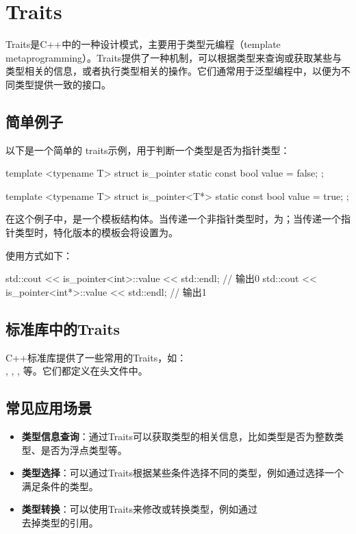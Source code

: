 \chapter{Traits}
Traits是C++中的一种设计模式，主要用于类型元编程（template metaprogramming）。Traits提供了一种机制，可以根据类型来查询或获取某些与类型相关的信息，或者执行类型相关的操作。它们通常用于泛型编程中，以便为不同类型提供一致的接口。

\section{简单例子}
以下是一个简单的 traits示例，用于判断一个类型是否为指针类型：

\begin{cpplst}
template <typename T>
struct is_pointer {
    static const bool value = false;
};

template <typename T>
struct is_pointer<T*> {
    static const bool value = true;
};
\end{cpplst}

在这个例子中，是一个模板结构体。当传递一个非指针类型时，为；当传递一个指针类型时，特化版本的模板会将设置为。

使用方式如下：

\begin{cpplst}
std::cout << is_pointer<int>::value << std::endl;  // 输出0
std::cout << is_pointer<int*>::value << std::endl; // 输出1
\end{cpplst}

\section{标准库中的Traits}
C++标准库提供了一些常用的Traits，如：\\,
, , 等。它们都定义在头文件中。

\section{常见应用场景}
\begin{itemize}
	\item \textbf{类型信息查询}：通过Traits可以获取类型的相关信息，比如类型是否为整数类型、是否为浮点类型等。
	\item \textbf{类型选择}：可以通过Traits根据某些条件选择不同的类型，例如通过选择一个满足条件的类型。
	\item \textbf{类型转换}：可以使用Traits来修改或转换类型，例如通过\\去掉类型的引用。
\end{itemize}

